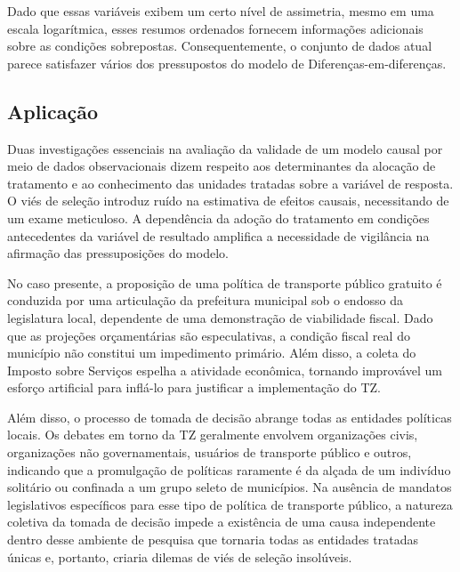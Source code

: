 \documentclass[12pt, a4paper, twoside]{article}
\numberwithin{equation}{subsection} %
\begin{document}
Dado que essas variáveis \hspace{0pt}\hspace{0pt}exibem um certo nível
de assimetria, mesmo em uma escala logarítmica, esses resumos ordenados
fornecem informações adicionais sobre as condições sobrepostas.
Consequentemente, o conjunto de dados atual parece satisfazer vários dos
pressupostos do modelo de Diferenças-em-diferenças.

\hypertarget{aplicauxe7uxe3o}{%
\subsection{Aplicação}\label{aplicauxe7uxe3o}}

Duas investigações essenciais na avaliação da validade de um modelo
causal por meio de dados observacionais dizem respeito aos determinantes
da alocação de tratamento e ao conhecimento das unidades tratadas sobre
a variável de resposta. O viés de seleção introduz ruído na estimativa
de efeitos causais, necessitando de um exame meticuloso. A dependência
da adoção do tratamento em condições antecedentes da variável de
resultado amplifica a necessidade de vigilância na afirmação das
pressuposições do modelo.

No caso presente, a proposição de uma política de transporte público
gratuito é conduzida por uma articulação da prefeitura municipal sob o
endosso da legislatura local, dependente de uma demonstração de
viabilidade fiscal. Dado que as projeções orçamentárias são
especulativas, a condição fiscal real do município não constitui um
impedimento primário. Além disso, a coleta do Imposto sobre Serviços
espelha a atividade econômica, tornando improvável um esforço artificial
para inflá-lo para justificar a implementação do TZ.

Além disso, o processo de tomada de decisão abrange todas as entidades
políticas locais. Os debates em torno da TZ geralmente envolvem
organizações civis, organizações não governamentais, usuários de
transporte público e outros, indicando que a promulgação de políticas
raramente é da alçada de um indivíduo solitário ou confinada a um grupo
seleto de municípios. Na ausência de mandatos legislativos específicos
para esse tipo de política de transporte público, a natureza coletiva da
tomada de decisão impede a existência de uma causa independente dentro
desse ambiente de pesquisa que tornaria todas as entidades tratadas
únicas e, portanto, criaria dilemas de viés de seleção insolúveis.
\end{document}
